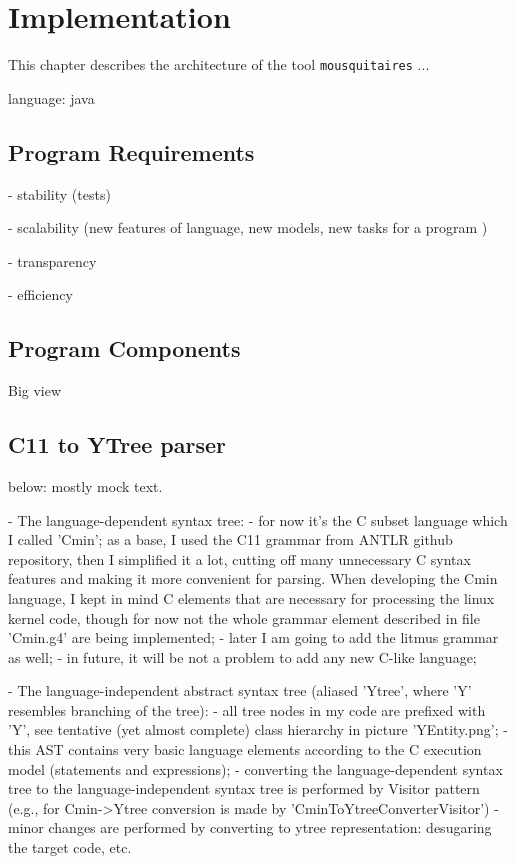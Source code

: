 \chapter{Implementation}
\label{ch:impl}

This chapter describes the architecture of the tool \texttt{mousquitaires} ...

language: java


\section{Program Requirements}
\label{ch:impl:requirements}

- stability (tests)

- scalability (new features of language, new models, new tasks for a program )

- transparency

- efficiency

\section{Program Components}
\label{ch:impl:comp}
Big view

\section{C11 to YTree parser}
\label{ch:impl:ytree}

below: mostly mock text.

- The language-dependent syntax tree:
        - for now it's the C subset language which I called 'Cmin'; as a base, I used the C11 grammar from ANTLR github repository, then I simplified it a lot, cutting off many unnecessary C syntax features and making it more convenient for parsing. When developing the Cmin language, I kept in mind C elements that are necessary for processing the linux kernel code, though for now not the whole grammar element described in file 'Cmin.g4' are being implemented;
        - later I am going to add the litmus grammar as well;
        - in future, it will be not a problem to add any new C-like language;

- The language-independent abstract syntax tree (aliased 'Ytree', where 'Y' resembles branching of the tree):
        - all tree nodes in my code are prefixed with 'Y', see tentative (yet almost complete) class hierarchy in picture 'YEntity.png';
        - this AST contains very basic language elements according to the C execution model (statements and expressions);
        - converting the language-dependent syntax tree to the language-independent syntax tree is performed by Visitor pattern (e.g., for Cmin->Ytree conversion is made by 'CminToYtreeConverterVisitor')
        - minor changes are performed by converting to ytree representation: desugaring the target code, etc.


